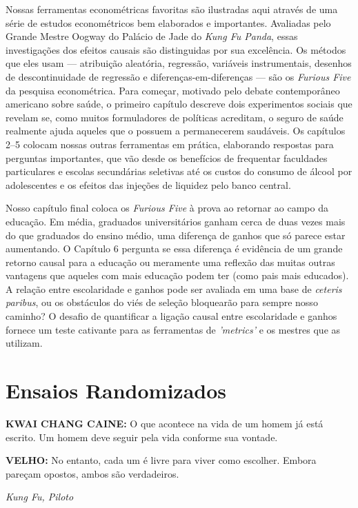 \documentclass[a4paper,12pt]{article}[abntex2]
\begin{document}
Nossas ferramentas econométricas favoritas são ilustradas aqui através de uma série de estudos econométricos bem elaborados e importantes. Avaliadas pelo Grande Mestre Oogway do Palácio de Jade do \emph{Kung Fu Panda}, essas investigações dos efeitos causais são distinguidas por sua excelência. Os métodos que eles usam — atribuição aleatória, regressão, variáveis instrumentais, desenhos de descontinuidade de regressão e diferenças-em-diferenças — são os \emph{Furious Five} da pesquisa econométrica. Para começar, motivado pelo debate contemporâneo americano sobre saúde, o primeiro capítulo descreve dois experimentos sociais que revelam se, como muitos formuladores de políticas acreditam, o seguro de saúde realmente ajuda aqueles que o possuem a permanecerem saudáveis. Os capítulos 2–5 colocam nossas outras ferramentas em prática, elaborando respostas para perguntas importantes, que vão desde os benefícios de frequentar faculdades particulares e escolas secundárias seletivas até os custos do consumo de álcool por adolescentes e os efeitos das injeções de liquidez pelo banco central.

Nosso capítulo final coloca os \emph{Furious Five} à prova ao retornar ao campo da educação. Em média, graduados universitários ganham cerca de duas vezes mais do que graduados do ensino médio, uma diferença de ganhos que só parece estar aumentando. O Capítulo 6 pergunta se essa diferença é evidência de um grande retorno causal para a educação ou meramente uma reflexão das muitas outras vantagens que aqueles com mais educação podem ter (como pais mais educados). A relação entre escolaridade e ganhos pode ser avaliada em uma base de \emph{ceteris paribus}, ou os obstáculos do viés de seleção bloquearão para sempre nosso caminho? O desafio de quantificar a ligação causal entre escolaridade e ganhos fornece um teste cativante para as ferramentas de \emph{'metrics'} e os mestres que as utilizam.

\newpage

\section{Ensaios Randomizados}

\textbf{KWAI CHANG CAINE:} O que acontece na vida de um homem já está escrito. Um homem deve seguir pela vida conforme sua vontade.

\textbf{VELHO:} No entanto, cada um é livre para viver como escolher. Embora pareçam opostos, ambos são verdadeiros.

\emph{Kung Fu, Piloto}
\end{document}
